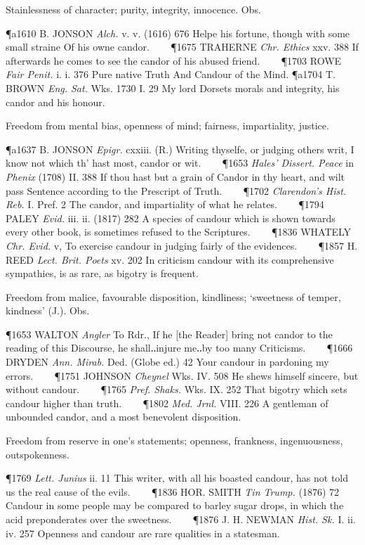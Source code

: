 \begin{description}[wide, labelwidth=!, labelindent=0pt]
\begin{myenumerate}
 Stainlessness of character; purity, integrity, innocence. Obs.

\P a1610 B. JONSON  \textit{Alch.} v. v. (1616) 676 Helpe his fortune, though with some small straine Of his owne candor.    
\P 1675 TRAHERNE  \textit{Chr. Ethics} xxv. 388 If afterwards he comes to see the candor of his abused friend.    
\P 1703 ROWE  \textit{Fair Penit.} i. i. 376 Pure native Truth And Candour of the Mind.
\P a1704 T. BROWN  \textit{Eng. Sat.} Wks. 1730 I. 29 My lord Dorsets morals and integrity, his candor and his honour.

 Freedom from mental bias, openness of mind; fairness, impartiality, justice.

\P a1637 B. JONSON  \textit{Epigr.} cxxiii. (R.) Writing thyselfe, or judging others writ, I know not which th' hast most, candor or wit.    
\P 1653 \textit{Hales'  Dissert. Peace} in \textit{Phenix} (1708) II. 388 If thou hast but a grain of Candor in thy heart, and wilt pass Sentence according to the Prescript of Truth.    
\P 1702 \textit{Clarendon's  Hist. Reb.} I. Pref. 2 The candor, and impartiality of what he relates.    
\P 1794 PALEY  \textit{Evid.} iii. ii. (1817) 282 A species of candour which is shown towards every other book, is sometimes refused to the Scriptures.    
\P 1836 WHATELY  \textit{Chr. Evid.} v, To exercise candour in judging fairly of the evidences.    
\P 1857 H. REED  \textit{Lect. Brit. Poets} xv. 202 In criticism candour with its comprehensive sympathies, is as rare, as bigotry is frequent.

 Freedom from malice, favourable disposition, kindliness; ‘sweetness of temper, kindness’ (J.). Obs.

\P 1653 WALTON  \textit{Angler} To Rdr., If he [the Reader] bring not candor to the reading of this Discourse, he shall‥injure me‥by too many Criticisms.    
\P 1666 DRYDEN  \textit{Ann. Mirab.} Ded. (Globe ed.) 42 Your candour in pardoning my errors.    
\P 1751 JOHNSON  \textit{Cheynel} Wks. IV. 508 He shews himself sincere, but without candour.    
\P 1765 \textit{Pref. Shaks.} Wks. IX. 252 That bigotry which sets candour higher than truth.    
\P 1802 \textit{Med.  Jrnl.} VIII. 226 A gentleman of unbounded candor, and a most benevolent disposition.

 Freedom from reserve in one's statements; openness, frankness, ingenuousness, outspokenness.

\P 1769 \textit{Lett.  Junius} ii. 11 This writer, with all his boasted candour, has not told us the real cause of the evils.    
\P 1836 HOR.  SMITH \textit{Tin Trump.} (1876) 72 Candour in some people may be compared to barley sugar drops, in which the acid preponderates over the sweetness.    
\P 1876 J. H. NEWMAN  \textit{Hist. Sk.} I. ii. iv. 257 Openness and candour are rare qualities in a statesman.
\end{myenumerate}



\end{description}
